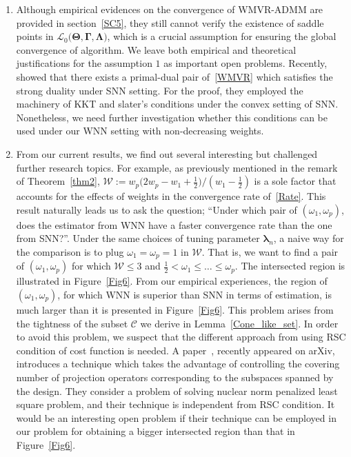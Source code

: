 \documentclass[alpha-refs]{wiley-article}
\begin{document}
\begin{enumerate}
    \item Although empirical evidences on the convergence of WMVR-ADMM are provided in section~\ref{SC5}, they still cannot verify the existence of saddle points in $\mathcal{L}_{0}\big(\boldsymbol{\Theta},\boldsymbol{\Gamma},\boldsymbol{\Lambda}\big)$, which is a crucial assumption for ensuring the global convergence of algorithm.
    We leave both empirical and theoretical justifications for the assumption $1$ as important open problems. 
    Recently,~\citet{shang2021regularization} showed that there exists a primal-dual pair of~\eqref{WMVR} which satisfies the strong duality under SNN setting.
    For the proof, they employed the machinery of KKT and slater's conditions under the convex setting of SNN.
    Nonetheless, we need further investigation whether this conditions can be used under our WNN setting with non-decreasing weights.

    \item From our current results, we find out several interesting but challenged further research topics. 
    For example, as previously mentioned in the remark of Theorem~\ref{thm2}, $\mathcal{W}:= w_{p}\big(2w_{p}-w_{1}+\frac{1}{2}\big)/(w_{1}-\frac{1}{2})$ is a sole factor that accounts for the effects of weights in the convergence rate of~\eqref{Rate}.
    This result naturally leads us to ask the question; ``Under which pair of $(\omega_{1},\omega_{p})$, does the estimator from WNN have a faster convergence rate than the one from SNN?''.
    Under the same choices of tuning parameter $\boldsymbol{\lambda}_{n}$, a naive way for the comparison is to plug $\omega_{1}=\omega_{p}=1$ in $\mathcal{W}$. 
    That is, we want to find a pair of $(\omega_{1},\omega_{p})$ for which $\mathcal{W} \leq 3$ and $\frac{1}{2} < \omega_{1} \leq \dots \leq \omega_{p}$.
    The intersected region is illustrated in Figure~\ref{Fig6}.
    From our empirical experiences, the region of $(\omega_{1},\omega_{p})$, for which WNN is superior than SNN in terms of estimation, is much larger than it is presented in Figure~\ref{Fig6}.
    This problem arises from the tightness of the subset $\mathcal{C}$ we derive in Lemma~\ref{Cone_like_set}.
    In order to avoid this problem, we suspect that the different approach from using RSC condition of cost function is needed.
    A paper~\citet{law2021rank}, recently appeared on arXiv, introduces a technique which takes the advantage of controlling the covering number of projection operators corresponding to the subspaces spanned by the design.
    They consider a problem of solving nuclear norm penalized least square problem, and their technique is independent from RSC condition. 
    It would be an interesting open problem if their technique can be employed in our problem for obtaining a bigger intersected region than that in Figure~\ref{Fig6}.
\end{enumerate}
\end{document}
